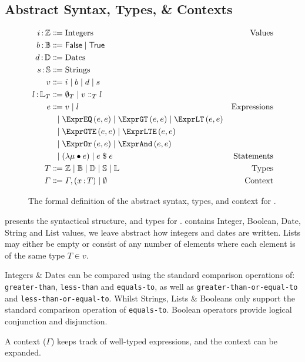 \subsection{Abstract Syntax, Types, \& Contexts}
\label{subsec:defs}

\begin{figure}[ht]
  \centering
\begin{align*}
  \ty{i}{\mathbb{Z}}
  &
    \Coloneqq
    \text{Integers}
  & \text{Values}
  \\
  \ty{b}{\mathbb{B}}
  & \Coloneqq
    \mathsf{False}\alt\mathsf{True}
  \\
  \ty{d}{\mathbb{D}}
  & \Coloneqq
    \text{Dates}
  \\
  \ty{s}{\mathbb{S}}
  & \Coloneqq
    \text{Strings}
  \\
  v
  &
    \Coloneqq
    i
    \alt
    b
    \alt
    d
    \alt
    s
  \\
  \ty{l}{\mathbb{L}_T}
  & \Coloneqq
    \emptyset_T\alt{}v\Cons_T{}l
  \\
  e
  &
    \Coloneqq
    v
    \alt
    l
  & \text{Expressions}
  \\
  &
    \firstAlt
    \exprEQ{e}{e}
    \alt
    \exprGT{e}{e}
    \alt
    \exprLT{e}{e}
  \\
  & \firstAlt
    \exprGTE{e}{e}
    \alt
    \exprLTE{e}{e}
  &
  \\
  & \firstAlt
    \exprOr{e}{e}
    \alt
    \exprAnd{e}{e}
  &
  \\
  &
    \firstAlt
    \left( \lambda \mu \bullet e \right)
    \alt
    e \; \$ \; e
  &
    \text{Statements}
  \\
  T
  &
    \Coloneqq
    \mathbb{Z}
    \alt
    \mathbb{B}
    \alt
    \mathbb{D}
    \alt
    \mathbb{S}
    \alt
    \mathbb{L}
  &
    \text{Types}
  \\
  \Gamma
  &
    \Coloneqq
    \envAdd{(\ty{x}{T})}
    \alt
    \emptyset
    &
      \text{Context}
\end{align*}
  \caption{\label{fig:syntax}The formal definition of the abstract syntax, types, and context for \thePolicyLang.}
\end{figure}

 presents the syntactical structure, and types for \thePolicyLang.
\thePolicyLang contains Integer, Boolean, Date, String and List values, we leave abstract how integers and dates are written. Lists may either be empty or consist of any number of elements where each element is of the same type $T \in v$.

Integers \& Dates can be compared using the standard comparison operations of: \texttt{greater-than}, \texttt{less-than} and \texttt{equals-to}, as well as \texttt{greater-than-or-equal-to} and \texttt{less-than-or-equal-to}. Whilst Strings, Lists \& Booleans only support the standard comparison operation of \texttt{equals-to}.
Boolean operators provide logical conjunction and disjunction.

A context ($\Gamma$) keeps track of well-typed expressions, and the \thePolicyLang context can be expanded.

